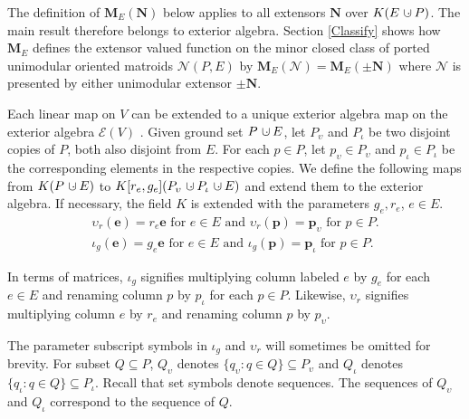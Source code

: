 \documentclass[12pt]{article}
\theoremstyle{definition}
\newcommand{\dunion}
{\mbox{\hbox{\hskip6pt$\cdot$\hskip-5.50pt$\cup$\hskip2pt}}}
\newcommand{\Is}{\ensuremath{\iota}}
\newcommand{\Vs}{\ensuremath{\upsilon}}
\newcommand{\FieldK}{\ensuremath{K}}
\newcommand{\ext}[1]{\ensuremath{\mathbf{#1}}}
\begin{document}
The definition of $\ext{M}_E(\ext{N})$ below applies to all
extensors $\ext{N}$ over $\FieldK (E\dunion P)$.  The main
result therefore belongs to exterior algebra.
Section \ref{Classify} shows how $\ext{M}_E$ defines the extensor valued 
function on the minor closed class of ported unimodular oriented matroids
$\mathcal{N}(P,E)$ by 
$\ext{M}_E(\mathcal{N})=\ext{M}_E(\ext{\pm N})$ where $\mathcal{N}$
is presented by either unimodular extensor $\pm \ext{N}$.  

Each linear map on $V$ can be extended to a unique exterior algebra 
map on the exterior algebra $\mathcal{E}(V)$
\cite[Theorem 7.1]{JacobsonI}.  Given ground set $P\dunion E$, let
$P_\Vs$ and $P_\Is$ be two disjoint copies of $P$, both also
disjoint from $E$.  For each $p\in P$,
let $p_\Vs\in P_\Vs$ and $p_\Is\in P_\Is$ be the corresponding elements 
in the respective copies.  We define the following maps
from $\FieldK (P\dunion E)$ to $\FieldK[r_e,g_e] (P_\Vs\dunion P_\Is\dunion E)$
and extend them to the exterior algebra.  If necessary,
the field $\FieldK$ is extended with the parameters $g_e,r_e$,
$e\in E$.
\begin{equation}
\begin{split}
\Vs_r(\ext{e}) = r_e \ext{e} \text{ for $e\in E$ and }
\Vs_r(\ext{p}) = \ext{p}_\Vs \text{ for $p\in P$.}\\
\Is_g(\ext{e}) = g_e \ext{e} \text{ for $e\in E$ and }
\Is_g(\ext{p}) = \ext{p}_\Is \text{ for $p\in P$.}
\end{split}
\end{equation}

In terms of matrices, $\Is_g$ signifies multiplying
column labeled $e$ by $g_e$ for each $e\in E$ and renaming
column $p$ by $p_\Is$ for each $p\in P$.  Likewise, $\Vs_r$
signifies multiplying
column $e$ by $r_e$ and renaming column $p$ by $p_\Vs$.

The parameter subscript symbols in $\Is_g$ and $\Vs_r$ will sometimes be
omitted for brevity.  For subset $Q\subseteq P$, 
$Q_{\Vs}$ denotes $\{q_{\Vs} : q\in Q\}\subseteq P_{\Vs}$ and 
$Q_\Is$ denotes $\{q_{\Is} : q\in Q\}\subseteq P_{\Is}$.
Recall that set symbols denote sequences.  The sequences of
$Q_{\Vs}$ and $Q_\Is$ correspond to the sequence of $Q$.
\end{document}
